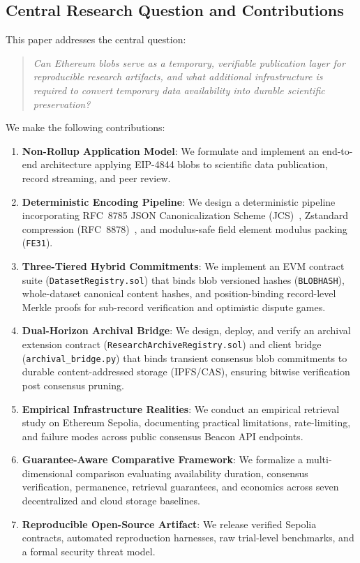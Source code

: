 \subsection{Central Research Question and Contributions}
This paper addresses the central question:
\begin{quote}
\textit{Can Ethereum blobs serve as a temporary, verifiable publication layer for reproducible research artifacts, and what additional infrastructure is required to convert temporary data availability into durable scientific preservation?}
\end{quote}

We make the following contributions:
\begin{enumerate}
    \item \textbf{Non-Rollup Application Model}: We formulate and implement an end-to-end architecture applying EIP-4844 blobs to scientific data publication, record streaming, and peer review.
    \item \textbf{Deterministic Encoding Pipeline}: We design a deterministic pipeline incorporating RFC~8785 JSON Canonicalization Scheme (JCS)~\cite{rfc8785}, Zstandard compression (RFC~8878)~\cite{rfc8878}, and modulus-safe field element modulus packing (\texttt{FE31}).
    \item \textbf{Three-Tiered Hybrid Commitments}: We implement an EVM contract suite (\texttt{DatasetRegistry.sol}) that binds blob versioned hashes (\texttt{BLOBHASH}), whole-dataset canonical content hashes, and position-binding record-level Merkle proofs for sub-record verification and optimistic dispute games.
    \item \textbf{Dual-Horizon Archival Bridge}: We design, deploy, and verify an archival extension contract (\texttt{ResearchArchiveRegistry.sol}) and client bridge (\texttt{archival\_bridge.py}) that binds transient consensus blob commitments to durable content-addressed storage (IPFS/CAS), ensuring bitwise verification post consensus pruning.
    \item \textbf{Empirical Infrastructure Realities}: We conduct an empirical retrieval study on Ethereum Sepolia, documenting practical limitations, rate-limiting, and failure modes across public consensus Beacon API endpoints.
    \item \textbf{Guarantee-Aware Comparative Framework}: We formalize a multi-dimensional comparison evaluating availability duration, consensus verification, permanence, retrieval guarantees, and economics across seven decentralized and cloud storage baselines.
    \item \textbf{Reproducible Open-Source Artifact}: We release verified Sepolia contracts, automated reproduction harnesses, raw trial-level benchmarks, and a formal security threat model.
\end{enumerate}
